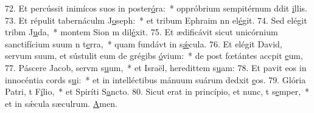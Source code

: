 72. Et percússit inimícos suos in poster\uline{ó}ra:~* oppróbrium sempitérnum ddit \uline{i}llis.
73. Et répulit tabernáculm J\uline{o}seph:~* et tribum Ephraim nn el\uline{é}git.
74. Sed elégit tribm J\uline{u}da,~* montem Sion m dil\uline{é}xit.
75. Et ædificávit sicut unicórnium sanctifícium suum n t\uline{e}rra,~* quam fundávt in s\uline{ǽ}cula.
76. Et elégit David, servum suum, et sústulit eum de grégibs \uline{ó}vium:~* de post fœtántes accpit \uline{e}um,
77. Páscere Jacob, servm s\uline{u}um,~* et Israël, heredittem s\uline{u}am:
78. Et pavit eos in innocéntia cords s\uline{u}i:~* et in intelléctibus mánuum suárum dedxit \uline{e}os.
79. Glória Patri, t F\uline{í}lio,~* et Spiríti S\uline{a}ncto.
80. Sicut erat in princípio, et nunc, t s\uline{e}mper,~* et in sǽcula sæculrum. \uline{A}men.
